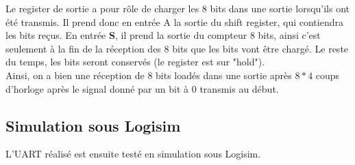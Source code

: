 \documentclass[a4paper]{article} %
\begin{document}
\begin{tcolorbox}[colframe=Monokaimagenta,colback=white]
Le register de sortie a pour rôle de charger les 8 bits dans une sortie lorsqu'ils ont été transmis. Il prend donc en entrée A la sortie du shift register, qui contiendra les bits reçus. En entrée \textbf{S}, il prend la sortie du compteur 8 bits, ainsi c'est seulement à la fin de la réception des 8 bits que les bits vont être chargé. Le reste du temps, les bits seront conservés (le register est sur "hold").\\
Ainsi, on a bien une réception de 8 bits loadés dans une sortie après $8*4$ coups d'horloge après le signal donné par un bit à $0$ transmis au début.


\end{tcolorbox}
 \subsection{Simulation sous Logisim}
L’UART réalisé est ensuite testé en simulation sous Logisim.
\end{document}
